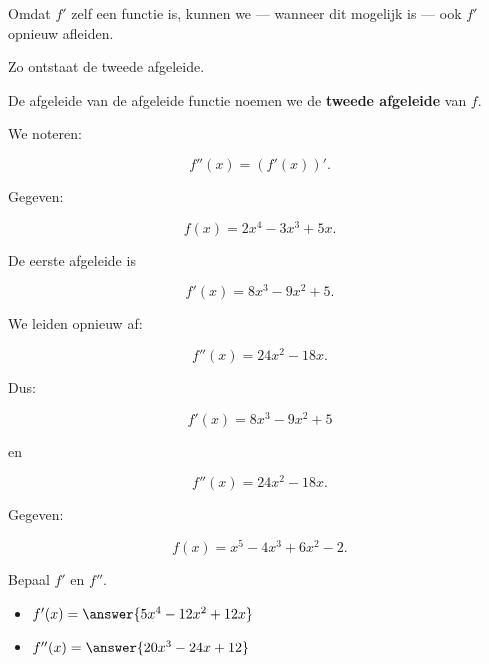 \documentclass{ximera}
\begin{document}


Omdat $f'$ zelf een functie is, kunnen we — wanneer dit mogelijk is —
ook $f'$ opnieuw afleiden.

Zo ontstaat de tweede afgeleide.

\begin{definitie}

De afgeleide van de afgeleide functie noemen we
de \textbf{tweede afgeleide} van $f$.

We noteren:

\[
\boxed{
f''(x)=(f'(x))'.
}
\]

\end{definitie}


\begin{voorbeeld}

Gegeven:

\[
f(x)=2x^4-3x^3+5x.
\]

De eerste afgeleide is

\[
f'(x)=8x^3-9x^2+5.
\]

We leiden opnieuw af:

\[
f''(x)=24x^2-18x.
\]

Dus:

\[
\boxed{
f'(x)=8x^3-9x^2+5
}
\]

en

\[
\boxed{
f''(x)=24x^2-18x.
}
\]

\end{voorbeeld}


\begin{oefening}{\oefB \ESS}

Gegeven:

\[
f(x)=x^5-4x^3+6x^2-2.
\]

Bepaal $f'$ en $f''$.

\begin{itemize}
  \item \( f'(x)=\answer{5x^4-12x^2+12x} \)
  \item \(f''(x)=\answer{20x^3-24x+12} \)
\end{itemize}

\end{oefening}
\end{document}
